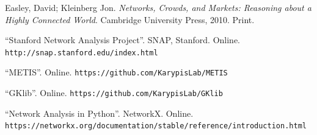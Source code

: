 \documentclass[letterpaper, 11pt]{article}
\newcommand{\1}{\mathds{1}}	%
\theoremstyle{definition}
\begin{document}
\begin{thebibliography}{2}

  Easley, David; Kleinberg Jon.
  \textit{Networks, Crowds, and Markets: Reasoning about a Highly Connected World}.
  Cambridge University Press, 2010.
  Print.
  
  ``Stanford Network Analysis Project''.
  SNAP, Stanford.
  Online. 
  \texttt{http://snap.stanford.edu/index.html}
  
  ``METIS''.
  Online. 
  \texttt{https://github.com/KarypisLab/METIS}


  ``GKlib''.
  Online. 
  \texttt{https://github.com/KarypisLab/GKlib}
  
  
  ``Network Analysis in Python''.
  NetworkX.
  Online. 
  \texttt{https://networkx.org/documentation/stable/reference/introduction.html}

\end{thebibliography}

\end{document}
